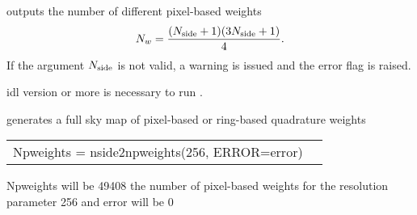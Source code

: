 \begin{codedescription}
{\facname outputs the number of different pixel-based weights
  $$N_w=\frac{(N_{\mathrm{side}}+1)(3N_{\mathrm{side}}+1)}{4}.$$ If the argument $N_{\mathrm{side}}$ is not
  valid, a  warning is issued and the error flag is raised.}
\end{codedescription}



\begin{related}
  \begin{sulist}{} %
    \item[idl] version \idlversion or more is necessary to run \facname.	
  \item[\htmlref{unfold\_weights}{idl:unfold_weights}] generates a full sky map of pixel-based or ring-based quadrature weights
  \end{sulist}
\end{related}

\begin{example}
{
\begin{tabular}{ll} %
Npweights = nside2npweights(256, ERROR=error)
\end{tabular}
}
{
Npweights will be 49408 the number of pixel-based weights for the \healpix
resolution parameter 256 and error will be 0}
\end{example}

